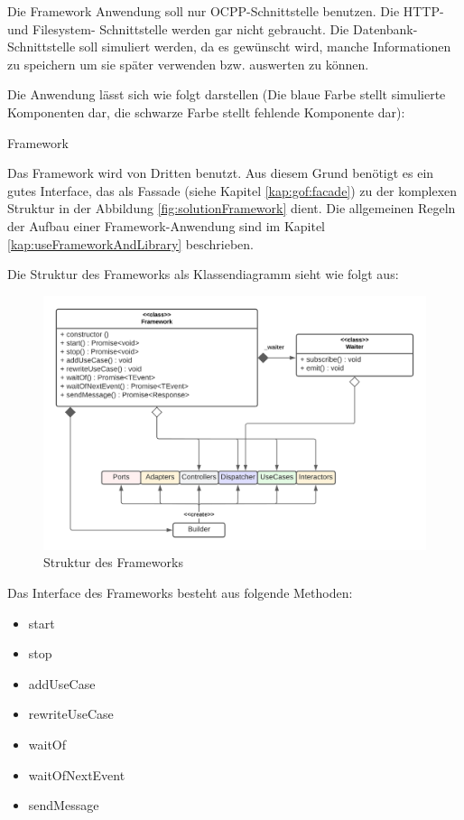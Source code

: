 Die Framework Anwendung soll nur OCPP-Schnittstelle benutzen. 
Die HTTP- und Filesystem- Schnittstelle werden gar nicht gebraucht.
Die Datenbank-Schnittstelle soll simuliert werden, da es gewünscht wird, 
manche Informationen zu speichern um sie später verwenden bzw. auswerten zu können.

Die Anwendung lässt sich wie folgt darstellen 
(Die blaue Farbe stellt simulierte Komponenten dar, die schwarze Farbe stellt fehlende Komponente dar):

{Framework}

\newpage
Das Framework wird von Dritten benutzt. Aus diesem Grund benötigt es ein gutes Interface, 
das als Fassade (siehe Kapitel \ref{kap:gof:facade}) 
zu der komplexen Struktur in der Abbildung \ref{fig:solutionFramework} dient.
Die allgemeinen Regeln der Aufbau einer Framework-Anwendung sind im Kapitel \ref{kap:useFrameworkAndLibrary} beschrieben.

Die Struktur des Frameworks als Klassendiagramm sieht wie folgt aus:
\begin{figure}[H]
    \centering
    \includegraphics[width=1\textwidth]{./images/FrameworkKlassenDiagramm.png}
    \caption[Struktur des Frameworks]{Struktur des Frameworks}
    \label{fig:FrameworkStruktur}
\end{figure}

Das Interface des Frameworks besteht aus folgende Methoden:
\begin{itemize}
    \item start
    \item stop
    \item addUseCase
    \item rewriteUseCase
    \item waitOf
    \item waitOfNextEvent
    \item sendMessage
\end{itemize}

